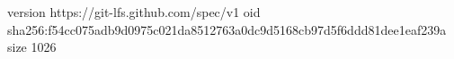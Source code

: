 version https://git-lfs.github.com/spec/v1
oid sha256:f54cc075adb9d0975c021da8512763a0dc9d5168cb97d5f6ddd81dee1eaf239a
size 1026
